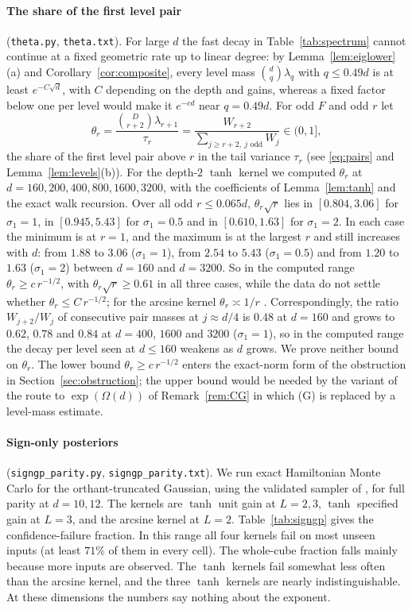 \documentclass[11pt]{article}
\theoremstyle{definition}\newtheorem{assumption}[theorem]{Assumption}
\theoremstyle{remark}\newtheorem{remark}[theorem]{Remark}
\begin{document}
\paragraph{The share of the first level pair} (\texttt{theta.py},
\texttt{theta.txt}). For large $d$ the fast decay in
Table~\ref{tab:spectrum} cannot continue at a fixed geometric rate up to
linear degree: by Lemma~\ref{lem:eiglower}(a) and
Corollary~\ref{cor:composite}, every level mass $\binom dq\lambda_q$ with
$q\le0.49d$ is at least $e^{-C\sqrt d}$, with $C$ depending on the depth and
gains, whereas a fixed factor below one per level would make it $e^{-cd}$
near $q=0.49d$. For odd $F$ and odd $r$ let
\[
 \theta_r=\frac{\binom D{r+2}\lambda_{r+1}}{\tau_r}
 =\frac{W_{r+2}}{\sum_{j\ge r+2,\ j\text{ odd}}W_j}\in(0,1],
\]
the share of the first level pair above $r$ in the tail variance $\tau_r$
(see \eqref{eq:pairs} and Lemma~\ref{lem:levels}(b)). For the depth-$2$
$\tanh$ kernel we computed $\theta_r$ at $d=160,200,400,800,1600,3200$, with
the coefficients of Lemma~\ref{lem:tanh} and the exact walk recursion. Over
all odd $r\le0.065d$, $\theta_r\sqrt r$ lies in $[0.804,3.06]$ for
$\sigma_1=1$, in $[0.945,5.43]$ for $\sigma_1=0.5$ and in $[0.610,1.63]$ for
$\sigma_1=2$. In each case the minimum is at $r=1$, and the maximum is at the
largest $r$ and still increases with $d$: from $1.88$ to $3.06$
($\sigma_1=1$), from $2.54$ to $5.43$ ($\sigma_1=0.5$) and from $1.20$ to
$1.63$ ($\sigma_1=2$) between $d=160$ and $d=3200$. So in the computed range
$\theta_r\ge c\,r^{-1/2}$, with $\theta_r\sqrt r\ge0.61$ in all three cases,
while the data do not settle
whether $\theta_r\le C\,r^{-1/2}$; for the arcsine kernel
$\theta_r\asymp1/r$ \cite[Lemma~3.2]{subcritical}. Correspondingly, the
ratio $W_{j+2}/W_j$ of consecutive pair masses at $j\approx d/4$ is $0.48$
at $d=160$ and grows to $0.62$, $0.78$ and $0.84$ at $d=400$, $1600$ and
$3200$ ($\sigma_1=1$), so in the computed range the decay per level seen at
$d\le160$ weakens as $d$ grows. We prove neither bound on $\theta_r$. The
lower bound $\theta_r\ge c\,r^{-1/2}$ enters the exact-norm form of the
obstruction in Section~\ref{sec:obstruction}; the upper bound would be
needed by the variant of the route to $\exp(\Omega(d))$ of
Remark~\ref{rem:CG} in which (G) is replaced by a level-mass estimate.

\paragraph{Sign-only posteriors} (\texttt{signgp\_parity.py},
\texttt{signgp\_parity.txt}). We run exact Hamiltonian Monte Carlo for the
orthant-truncated Gaussian, using the validated sampler of
\cite{beyondparity}, for full parity at $d=10,12$. The kernels are $\tanh$
unit gain at $L=2,3$, $\tanh$ specified gain at $L=3$, and the arcsine
kernel at $L=2$. Table~\ref{tab:signgp} gives the confidence-failure
fraction. In this range all four kernels fail on most unseen inputs (at least $71\%$ of them in every cell). The whole-cube fraction falls mainly because more inputs are observed. The $\tanh$ kernels fail somewhat less often than the arcsine kernel, and the three $\tanh$ kernels are nearly indistinguishable. At these dimensions the numbers say nothing about the exponent.
\end{document}
